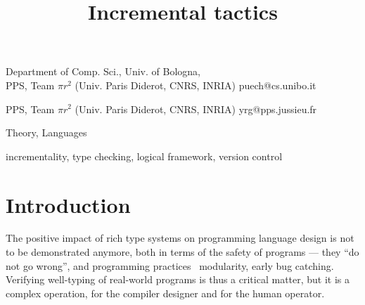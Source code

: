 \documentclass[9pt]{sigplanconf}
\begin{document}
\copyrightdata{[to be supplied]}


\title{Incremental tactics}

           {Department of Comp. Sci., Univ. of Bologna,\\
             PPS, Team $\pi r^2$ (Univ. Paris Diderot, CNRS, INRIA)}
           {puech@cs.unibo.it}

           {PPS, Team $\pi r^2$ (Univ. Paris Diderot, CNRS, INRIA)}
           {yrg@pps.jussieu.fr}

\maketitle

\begin{abstract}
\end{abstract}

 

\terms
Theory, Languages

\keywords
incrementality, type checking, logical framework, version control


\section*{Introduction}


The positive impact of rich type systems on programming language
design is not to be demonstrated anymore, both in terms of the safety
of programs --- they ``do not go wrong'', and programming practices
\eg\ modularity, early bug catching. Verifying well-typing of
real-world programs is thus a critical matter, but it is a complex
operation, for the compiler designer and for the human operator.
\end{document}
